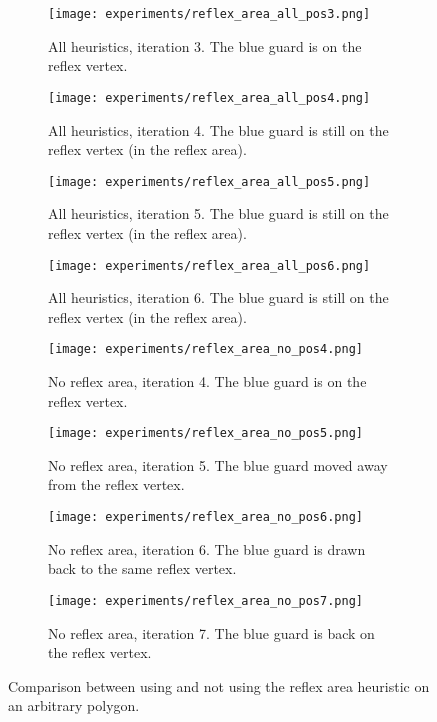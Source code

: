 \begin{figure}[h!]
    \centering
    \begin{subfigure}{0.45\textwidth}
        \texttt{[image: experiments/reflex\_area\_all\_pos3.png]}
        \caption{All heuristics, iteration 3. The blue guard is on the reflex vertex.}
        \label{fig:reflex_area_all1}
    \end{subfigure}
    \hfill
    \begin{subfigure}{0.45\textwidth}
        \texttt{[image: experiments/reflex\_area\_all\_pos4.png]}
        \caption{All heuristics, iteration 4. The blue guard is still on the reflex vertex (in the reflex area).}
    \end{subfigure}
    \hfill
    \begin{subfigure}{0.45\textwidth}
        \texttt{[image: experiments/reflex\_area\_all\_pos5.png]}
        \caption{All heuristics, iteration 5. The blue guard is still on the reflex vertex (in the reflex area).}
    \end{subfigure}
    \hfill
    \begin{subfigure}{0.45\textwidth}
        \texttt{[image: experiments/reflex\_area\_all\_pos6.png]}
        \caption{All heuristics, iteration 6. The blue guard is still on the reflex vertex (in the reflex area).}
        \label{fig:reflex_area_all4}
    \end{subfigure}
    \begin{subfigure}{0.45\textwidth}
        \texttt{[image: experiments/reflex\_area\_no\_pos4.png]}
        \caption{No reflex area, iteration 4. The blue guard is on the reflex vertex.}
        \label{fig:reflex_area_no1}
    \end{subfigure}
    \hfill
    \begin{subfigure}{0.45\textwidth}
        \texttt{[image: experiments/reflex\_area\_no\_pos5.png]}
        \caption{No reflex area, iteration 5. The blue guard moved away from the reflex vertex.}
        \label{fig:reflex_area_no2}
    \end{subfigure}
    \hfill
    \begin{subfigure}{0.45\textwidth}
        \texttt{[image: experiments/reflex\_area\_no\_pos6.png]}
        \caption{No reflex area, iteration 6. The blue guard is drawn back to the same reflex vertex.}
        \label{fig:reflex_area_no3}
    \end{subfigure}
    \hfill
    \begin{subfigure}{0.45\textwidth}
        \texttt{[image: experiments/reflex\_area\_no\_pos7.png]}
        \caption{No reflex area, iteration 7. The blue guard is back on the reflex vertex.}
        \label{fig:reflex_area_no4}
    \end{subfigure}
    \caption{Comparison between using and not using the reflex area heuristic on an arbitrary polygon.}
    \label{fig:reflex_area_eg}
\end{figure}

